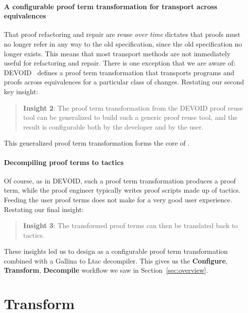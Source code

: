\paragraph{A configurable proof term transformation for transport across equivalences}

That proof refactoring and repair are reuse \textit{over time} dictates that proofs
must no longer refer in any way to the old specification, since the old specification no longer exists.
This means that most transport methods %
are not immediately useful for refactoring and repair.
There is one exception that we are aware of: \textsc{DEVOID}~\cite{Ringer2019} defines a proof term transformation
that transports programs and proofs across equivalences for a particular class of changes.
Restating our second key insight:

\begin{quote}
\textbf{Insight 2}:
The proof term transformation from the \textsc{DEVOID} proof reuse tool can be generalized
to build such a generic proof reuse tool, and the result is configurable both by the developer and by the user.
\end{quote}
This generalized proof term transformation forms the core of \toolname.

\paragraph{Decompiling proof terms to tactics}

Of course, as in \textsc{DEVOID}, such a proof term transformation produces a proof term,
while the proof engineer typically writes proof scripts made up of tactics.
Feeding the user proof terms does not make for a very good user experience.
Restating our final insight:

\begin{quote}
\textbf{Insight 3}: The transformed proof terms can then be translated back to tactics.
\end{quote} 

These insights led us to design \toolname as a configurable proof term transformation
combined with a Gallina to Ltac decompiler.
This gives us the \textbf{Configure}, \textbf{Transform}, \textbf{Decompile} workflow we saw in Section~\ref{sec:overview}.

\section{Transform}
\label{sec:meat}

